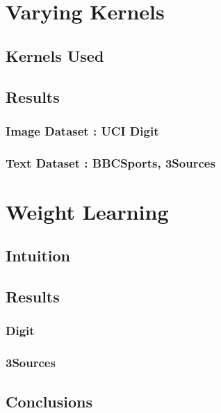 \documentclass[a4paper]{article}
\begin{document}
	\restoregeometry	

	\section{Varying Kernels}
	
	\subsection{Kernels Used}
	\subsection{Results}
	\subsubsection{Image Dataset : UCI Digit}
	\subsubsection{Text Dataset : BBCSports, 3Sources}
	
	\section{Weight Learning}
	\subsection{Intuition}
	\subsection{Results}
	\subsubsection{Digit}
	\subsubsection{3Sources}
	\subsection{Conclusions}
	
\end{document}
